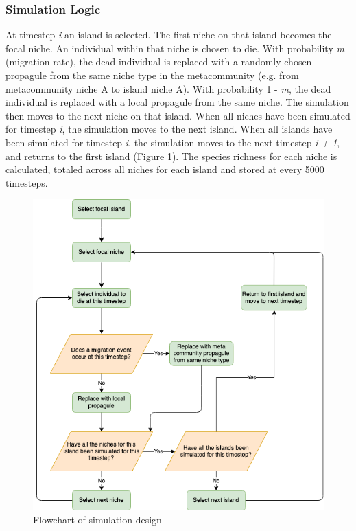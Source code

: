 \subsubsection{Simulation Logic}
At timestep \textit{i} an island is selected. The first niche on that island becomes the focal niche. An individual within that niche is chosen to die. With probability \textit{m} (migration rate), the dead individual is replaced with a randomly chosen propagule from the same niche type in the metacommunity (e.g. from metacommunity niche A to island niche A). With probability 1 - \textit{m}, the dead individual is replaced with a local propagule from the same niche. The simulation then moves to the next niche on that island. When all niches have been simulated for timestep \textit{i}, the simulation moves to the next island. When all islands have been simulated for timestep \textit{i}, the simulation moves to the next timestep \textit{i + 1}, and returns to the first island (Figure 1). The species richness for each niche is calculated, totaled across all niches for each island and stored at every 5000 timesteps.

\bigskip
 
 \begin{figure}[h!]
\centering
  \includegraphics[scale=0.4]{../../Other/neutral_flowchart2.png}
  \caption{Flowchart of simulation design}
  \label{fig:Flowchart}
\end{figure}



